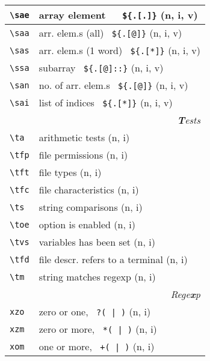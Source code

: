 \documentclass[oneside,10pt,landscape,DIV17]{scrartcl}
\begin{document}
\begin{multicols}{3}
\begin{center}
\begin{tabular}[]{|p{11mm}|p{60mm}|}
%
\hline \verb'\sae' & array element\ \ \ \verb'${.[.]}'     \hfill (n, i, v)\\
\hline \verb'\saa' & arr. elem.s (all) \ \verb'${.[@]}'    \hfill (n, i, v)\\
\hline \verb'\sas' & arr. elem.s (1 word) \ \verb'${.[*]}' \hfill (n, i, v)\\
\hline \verb'\ssa' & subarray \ \verb'${.[@]::}'           \hfill (n, i, v)\\
\hline \verb'\san' & no. of arr. elem.s \ \verb'${.[@]}'   \hfill (n, i, v)\\
\hline \verb'\sai' & list of indices \ \verb'${.[*]}'      \hfill (n, i, v)\\
\hline
\hline
\multicolumn{2}{|r|}{\textsl{\textbf{T}ests}}                 \\[1.0ex]
\hline \verb'\ta'  & arithmetic tests                  \hfill (n, i)\\
\hline \verb'\tfp' & file permissions                  \hfill (n, i)\\
\hline \verb'\tft' & file types                        \hfill (n, i)\\
\hline \verb'\tfc' & file characteristics              \hfill (n, i)\\
\hline \verb'\ts'  & string comparisons                \hfill (n, i)\\
\hline \verb'\toe' & option is enabled                 \hfill (n, i)\\
\hline \verb'\tvs' & variables has been set            \hfill (n, i)\\
\hline \verb'\tfd' & file descr.  refers to a terminal \hfill (n, i)\\
\hline \verb'\tm'  & string matches regexp             \hfill (n, i)\\
\hline
%
\hline
\multicolumn{2}{|r|}{\textsl{Rege\textbf{x}p}}     \\[1.0ex]
\hline     \verb'xzo' & zero or one,      \verb' ?( | )'  \hfill (n, i)\\ 
\hline     \verb'xzm' & zero or more,     \verb' *( | )'  \hfill (n, i)\\ 
\hline     \verb'xom' & one or more,      \verb' +( | )'  \hfill (n, i)\\ 

\end{tabular}
\end{center}
\end{multicols}
\end{document}
